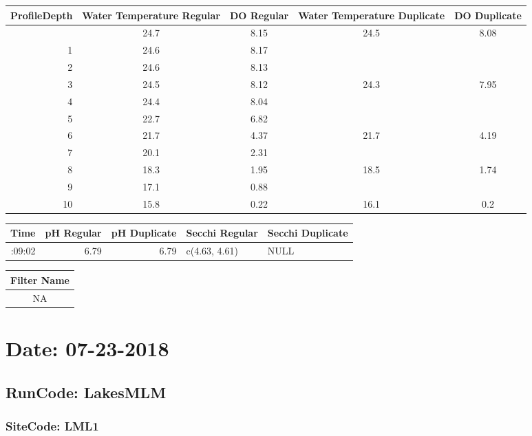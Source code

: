 \documentclass[
  letterpaper,
  DIV=11,
  numbers=noendperiod]{scrartcl}
\begin{document}
\begin{longtable*}{rcccc}
\toprule
ProfileDepth & Water Temperature Regular & DO Regular & Water Temperature Duplicate & DO Duplicate \\ 
\midrule{} & 24.7 & 8.15 & 24.5 & 8.08 \\ 
1 & 24.6 & 8.17 &  &  \\ 
2 & 24.6 & 8.13 &  &  \\ 
3 & 24.5 & 8.12 & 24.3 & 7.95 \\ 
4 & 24.4 & 8.04 &  &  \\ 
5 & 22.7 & 6.82 &  &  \\ 
6 & 21.7 & 4.37 & 21.7 & 4.19 \\ 
7 & 20.1 & 2.31 &  &  \\ 
8 & 18.3 & 1.95 & 18.5 & 1.74 \\ 
9 & 17.1 & 0.88 &  &  \\ 
10 & 15.8 & 0.22 & 16.1 & 0.2 \\ 
\bottomrule
\end{longtable*}

\begin{longtable*}{rrrll}
\toprule
Time & pH Regular & pH Duplicate & Secchi Regular & Secchi Duplicate \\ 
\midrule{}:09:02 & 6.79 & 6.79 & c(4.63, 4.61) & NULL \\ 
\bottomrule
\end{longtable*}

\begin{longtable*}{c}
\toprule
Filter Name \\ 
\midrule\addlinespace[2.5pt]
NA \\ 
\bottomrule
\end{longtable*}

\hypertarget{date-07-23-2018-1}{%
\section{Date: 07-23-2018}\label{date-07-23-2018-1}}

\hypertarget{runcode-lakesmlm-1}{%
\subsection{RunCode: LakesMLM}\label{runcode-lakesmlm-1}}

\hypertarget{sitecode-lml1}{%
\subsubsection{SiteCode: LML1}\label{sitecode-lml1}}
\end{document}
